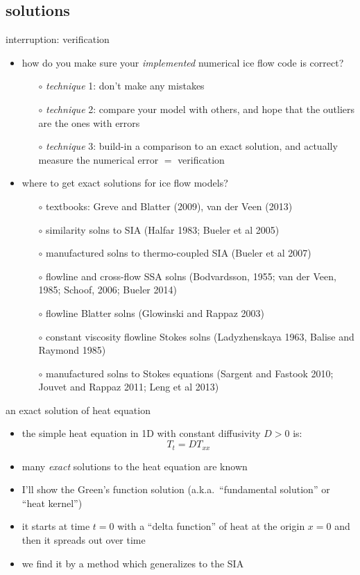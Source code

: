 \subsection{solutions}

\begin{frame}{interruption: verification}
\begin{itemize}
\item how do you make sure your \emph{implemented} numerical ice flow code is correct?
  \begin{itemize}
  \item[$\circ$] \emph{technique} 1: don't make any mistakes
  \item[$\circ$] \emph{technique} 2: compare your model with others, and hope that the outliers are the ones with errors
  \item[$\circ$] \emph{technique} 3: build-in a comparison to an exact solution, and actually measure the numerical error $=$ \alert{verification}
  \end{itemize}

\medskip
\item where to get exact solutions for ice flow models?
  \begin{itemize}
  \item[$\circ$] textbooks: Greve and Blatter (2009), van der Veen (2013)
  \item[$\circ$] similarity solns to SIA (Halfar 1983; Bueler et al 2005)
  \item[$\circ$] manufactured solns to thermo-coupled SIA (Bueler et al 2007)
  \item[$\circ$] flowline and cross-flow SSA solns (Bodvardsson, 1955; van der Veen, 1985; Schoof, 2006; Bueler 2014)
  \item[$\circ$] flowline Blatter solns (Glowinski and Rappaz 2003)
  \item[$\circ$] constant viscosity flowline Stokes solns (Ladyzhenskaya 1963, Balise and Raymond 1985)
  \item[$\circ$] manufactured solns to Stokes equations (Sargent and Fastook 2010; Jouvet and Rappaz 2011; Leng et al 2013)
  \end{itemize}
\end{itemize}
\end{frame}


\begin{frame}{an exact solution of heat equation}

\begin{itemize}
\item the simple heat equation in 1D with constant diffusivity $D>0$ is:
	$$T_t = D T_{xx}$$
\item many \emph{exact} solutions to the heat equation are known
\item I'll show the Green's function solution (a.k.a.~``fundamental solution'' or ``heat kernel'')
\item it starts at time $t=0$ with a ``delta function'' of heat at the origin $x=0$ and then it spreads out over time
\item we find it by a method which generalizes to the SIA
\end{itemize}
\end{frame}


